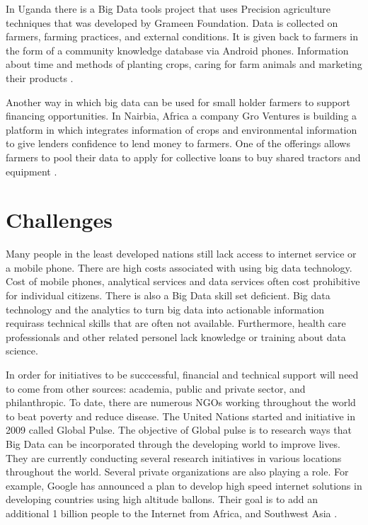 \documentclass[sigconf]{acmart}
\begin{document}
In Uganda there is a Big Data tools project that uses Precision agriculture techniques that was developed by Grameen Foundation. Data is collected on farmers, farming practices, and external conditions. It is given back to farmers in the form of a community knowledge database via Android phones. Information about time and methods of planting crops, caring for farm animals and marketing their products \cite{www-google-Hffpst}.

Another way in which big data can be used for small holder farmers to support financing opportunities. In Nairbia, Africa a company Gro Ventures is building a platform in which integrates information of crops and environmental information to give lenders confidence to lend money to farmers. One of the offerings allows farmers to pool their data to apply for collective loans to buy shared tractors and equipment \cite{www-google-Hffpst}.   

\section{Challenges}
Many people in the least developed nations still lack access to internet service or a mobile phone. There are high costs associated with using big data technology. Cost of mobile phones, analytical services and data services often cost prohibitive for individual citizens. There is also a Big Data skill set deficient. Big data technology and the analytics to turn big data into actionable information requirass technical skills that are often not available. Furthermore, health care professionals and other related personel lack knowledge or training about data science. 

In order for initiatives to be succcessful, financial and technical support will need to come from other sources: academia, public and private sector, and philanthropic. To date, there are numerous NGOs working throughout the world to beat poverty and reduce disease. The United Nations started and initiative in 2009 called Global Pulse. The objective of Global pulse is to research ways that Big Data can be incorporated through the developing world to improve lives. They are currently conducting several research initiatives in various locations throughout the world. Several private organizations are also playing a role. For example, Google has announced a plan to develop high speed internet solutions in developing countries using high altitude ballons. Their goal is to add an additional 1 billion people to the Internet from Africa, and Southwest Asia \cite{DevEcon}. 
\end{document}
